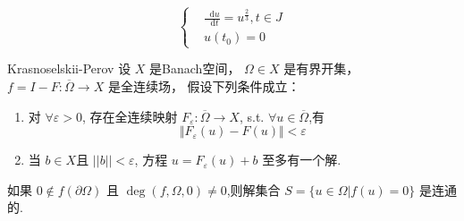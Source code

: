 \documentclass[a4,10pt]{ctexart}
\newcommand*{\dif}{\mathop{}\!\mathrm{d}}
\begin{document}
\begin{lt}
  \begin{equation}
    \left\{\begin{aligned}
      &\frac{\dif{u}}{\dif{t}} = u^{\frac{2}{3}}, t\in{J} \\ 
      &u(t_0) = 0
    \end{aligned}\right.
  \end{equation}
\end{lt}

\begin{dl}{Krasnoselskii-Perov}{}
  设 $X$ 是Banach空间， $\Omega\in{X}$ 是有界开集， $f=I-F:\overline{\Omega}\to{X}$ 是全连续场， 假设下列条件成立：
  \begin{enumerate}
    \item 对 $\forall{\varepsilon}>0$, 存在全连续映射 $F_{\varepsilon}:\overline{\Omega}\to{X}$, s.t. $\forall{u}\in\overline{\Omega}$,有
      \begin{equation}
        \Vert{F_{\varepsilon}(u)-F(u)}\Vert < \varepsilon
      \end{equation}
    \item 当 $b\in{X}$且 $||b||<\varepsilon$, 方程 $u=F_{\varepsilon}(u)+b$ 至多有一个解.
  \end{enumerate}
  如果 $0\notin{f(\partial{\Omega})}$ 且 $\deg(f,\Omega, 0)\neq{0}$,则解集合 $S=\{u\in\Omega\left|f(u)=0\right.\}$ 是连通的.
\end{dl}
\end{document}
